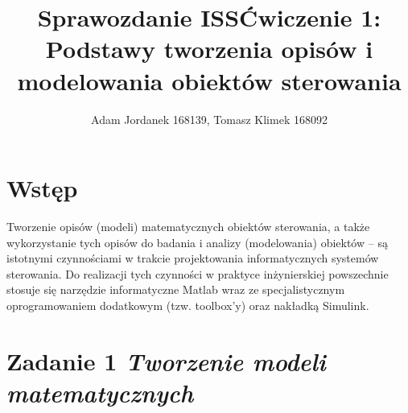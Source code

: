 \documentclass[a4paper,10pt]{article}
\title{Sprawozdanie ISS\newline\small Ćwiczenie 1: Podstawy tworzenia opisów i modelowania obiektów sterowania}
\author{Adam Jordanek 168139, Tomasz Klimek 168092}
\begin{document}
\maketitle

\section{Wstęp}\label{sec:wstęp}
Tworzenie opisów (modeli) matematycznych obiektów sterowania, a także wykorzystanie tych opisów do badania i analizy (modelowania) obiektów – są istotnymi czynnościami w trakcie projektowania informatycznych systemów sterowania. Do realizacji tych czynności w praktyce inżynierskiej powszechnie stosuje się narzędzie informatyczne Matlab wraz ze specjalistycznym oprogramowaniem dodatkowym (tzw. toolbox’y) oraz nakładką Simulink.

\section{Zadanie 1 \textit{\small Tworzenie modeli matematycznych}}\label{sec:zad1}
\end{document}
